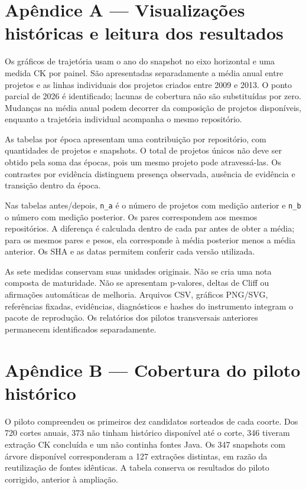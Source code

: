 \section*{Apêndice A --- Visualizações históricas e leitura dos resultados}
\label{ap:visualizacoes}

Os gráficos de trajetória usam o ano do snapshot no eixo horizontal e uma medida CK por painel. São apresentadas separadamente a média anual entre projetos e as linhas individuais dos projetos criados entre 2009 e 2013. O ponto parcial de 2026 é identificado; lacunas de cobertura não são substituídas por zero. Mudanças na média anual podem decorrer da composição de projetos disponíveis, enquanto a trajetória individual acompanha o mesmo repositório.

As tabelas por época apresentam uma contribuição por repositório, com quantidades de projetos e snapshots. O total de projetos únicos não deve ser obtido pela soma das épocas, pois um mesmo projeto pode atravessá-las. Os contrastes por evidência distinguem presença observada, ausência de evidência e transição dentro da época.

Nas tabelas antes/depois, \texttt{n\_a} é o número de projetos com medição anterior e \texttt{n\_b} o número com medição posterior. Os pares correspondem aos mesmos repositórios. A diferença é calculada dentro de cada par antes de obter a média; para os mesmos pares e pesos, ela corresponde à média posterior menos a média anterior. Os SHA e as datas permitem conferir cada versão utilizada.

As sete medidas conservam suas unidades originais. Não se cria uma nota composta de maturidade. Não se apresentam p-valores, deltas de Cliff ou afirmações automáticas de melhoria. Arquivos CSV, gráficos PNG/SVG, referências fixadas, evidências, diagnósticos e hashes do instrumento integram o pacote de reprodução. Os relatórios dos pilotos transversais anteriores permanecem identificados separadamente.

\section*{Apêndice B --- Cobertura do piloto histórico}

O piloto compreendeu os primeiros dez candidatos sorteados de cada coorte. Dos 720 cortes anuais, 373 não tinham histórico disponível até o corte, 346 tiveram extração CK concluída e um não continha fontes Java. Os 347 snapshots com árvore disponível corresponderam a 127 extrações distintas, em razão da reutilização de fontes idênticas. A tabela conserva os resultados do piloto corrigido, anterior à ampliação.

